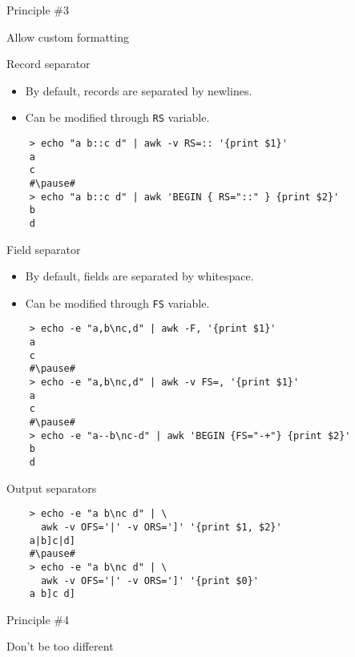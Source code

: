 \documentclass{beamer}
\renewcommand\big[1]{
  \begin{center}
    \Large{#1}
  \end{center}
}
\begin{document}
\begin{frame}
  \centering\Huge{Principle \#3}
  \big{Allow custom formatting}
\end{frame}

\begin{frame}[fragile]
  \big{Record separator}

  \begin{itemize}
    \item By default, records are separated by newlines.
    \item Can be modified through \texttt{RS} variable.
  \end{itemize}\pause

  \begin{lstlisting}
    > echo "a b::c d" | awk -v RS=:: '{print $1}'
    a
    c
    #\pause#
    > echo "a b::c d" | awk 'BEGIN { RS="::" } {print $2}'
    b
    d
  \end{lstlisting}
\end{frame}


\begin{frame}[fragile]
  \big{Field separator}

  \begin{itemize}
    \item By default, fields are separated by whitespace.
    \item Can be modified through \texttt{FS} variable.
  \end{itemize}\pause

  \begin{lstlisting}
    > echo -e "a,b\nc,d" | awk -F, '{print $1}'
    a
    c
    #\pause#
    > echo -e "a,b\nc,d" | awk -v FS=, '{print $1}'
    a
    c
    #\pause#
    > echo -e "a--b\nc-d" | awk 'BEGIN {FS="-+"} {print $2}'
    b
    d
  \end{lstlisting}
\end{frame}

\begin{frame}[fragile]
  \big{Output separators}

  \begin{lstlisting}
    > echo -e "a b\nc d" | \
      awk -v OFS='|' -v ORS=']' '{print $1, $2}'
    a|b]c|d]
    #\pause#
    > echo -e "a b\nc d" | \
      awk -v OFS='|' -v ORS=']' '{print $0}'
    a b]c d]
  \end{lstlisting}
\end{frame}

\begin{frame}
  \centering\Huge{Principle \#4}
  \big{Don't be too different}
\end{frame}
\end{document}
